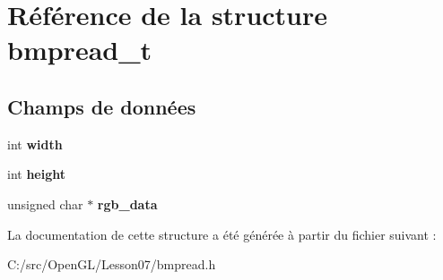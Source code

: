 \hypertarget{structbmpread__t}{}\section{Référence de la structure bmpread\+\_\+t}
\label{structbmpread__t}
\subsection*{Champs de données}
\begin{DoxyCompactItemize}
\item 
\hypertarget{structbmpread__t_a2474a5474cbff19523a51eb1de01cda4}{}int {\bfseries width}\label{structbmpread__t_a2474a5474cbff19523a51eb1de01cda4}

\item 
\hypertarget{structbmpread__t_ad12fc34ce789bce6c8a05d8a17138534}{}int {\bfseries height}\label{structbmpread__t_ad12fc34ce789bce6c8a05d8a17138534}

\item 
\hypertarget{structbmpread__t_a388ea047e848b26df779e8f9faf1e644}{}unsigned char $\ast$ {\bfseries rgb\+\_\+data}\label{structbmpread__t_a388ea047e848b26df779e8f9faf1e644}

\end{DoxyCompactItemize}


La documentation de cette structure a été générée à partir du fichier suivant \+:\begin{DoxyCompactItemize}
\item 
C\+:/src/\+Open\+G\+L/\+Lesson07/bmpread.\+h\end{DoxyCompactItemize}
